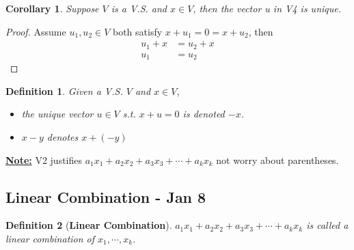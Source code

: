 \documentclass[12pt]{article}
\theoremstyle{plain}
\newtheorem{definition}{Definition}[subsection]
\newtheorem{corollary}{Corollary}[subsection]
\begin{document}
	\begin{corollary}
		Suppose $V$ is a V.S. and $x\in V$, then the vector u in V4 is unique.
	\end{corollary}
	\begin{proof}
		Assume $u_1, u_2\in V$ both satisfy $x+u_1=0=x+u_2$, then 
		\begin{align*}
			u_1+x&=u_2+x \tag{V1}\\
			u_1&=u_2 \tag{By Cancellation}
		\end{align*}
	\end{proof}

	\begin{definition}
		Given a V.S. $V$ and $x\in V$, 
		\begin{itemize}
			\item the unique vector $u\in V$ s.t. $x+u=0$ is denoted $-x$. 
			\item $x-y$ denotes $x + (-y)$
		\end{itemize}
	\end{definition}

	\underline{\textbf{Note:}} V2 justifies 
	$a_1x_1+a_2x_2+a_3x_3+\cdots+a_kx_k$
	not worry about parentheses. \\

	
	

\newpage
\subsection{Linear Combination - Jan 8}
	\begin{definition}[\textbf{Linear Combination}]
			$a_1x_1+a_2x_2+a_3x_3+\cdots+a_kx_k$ is called a linear 
			combination of $x_1,\cdots, x_k$.\\
	\end{definition}
\end{document}
